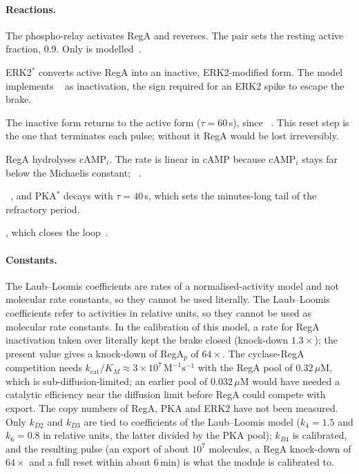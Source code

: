 \paragraph{Reactions.}
\begin{description}\itemsep0pt
\item[10.B1/10.B2] The phospho-relay activates RegA and reverses. The pair sets the resting active fraction, 0.9. Only  is modelled~\cite{thomason1999}.
\item[10.B3] ERK2$^*$ converts active RegA into an inactive, ERK2-modified form. The model implements ~\cite{maeda2004} as inactivation, the sign required for an ERK2 spike to escape the brake.
\item[10.B4] The inactive form returns to the active form ($\tau=60$\,s), since ~\cite{laub1998}. This reset step is the one that terminates each pulse; without it RegA would be lost irreversibly.
\item[10.C1/10.C2] RegA hydrolyses cAMP$_i$. The rate is linear in cAMP because cAMP$_i$ stays far below the Michaelis constant; ~\cite{thomason1999}.
\item[10.D1/10.D2] ~\cite{laub1998}, and PKA$^*$ decays with $\tau=40$\,s, which sets the minutes-long tail of the refractory period.
\item[10.D3] , which closes the loop~\cite{laub1998,aubry1997}.
\end{description}

\paragraph{Constants.}
The Laub--Loomis coefficients are rates of a normalised-activity model and not molecular rate constants, so they cannot be used literally.
The Laub--Loomis coefficients refer to activities in relative units, so they cannot be used as molecular rate constants.
In the calibration of this model, a rate for RegA inactivation taken over literally kept the brake closed (knock-down $1.3\times$); the present value gives a knock-down of RegA$_p$ of $64\times$.
The cyclase-RegA competition needs $k_\mathrm{cat}/K_M\approx3\times10^{7}\,\mathrm{M^{-1}s^{-1}}$ with the RegA pool of $0.32\,\mu$M, which is sub-diffusion-limited; an earlier pool of $0.032\,\mu$M would have needed a catalytic efficiency near the diffusion limit before RegA could compete with export.
The copy numbers of RegA, PKA and ERK2 have not been measured.
Only $k_{D2}$ and $k_{D3}$ are tied to coefficients of the Laub--Loomis model ($k_4=1.5$ and $k_6=0.8$ in relative units, the latter divided by the PKA pool); $k_{B4}$ is calibrated, and the resulting pulse (an export of about $10^7$ molecules, a RegA knock-down of $64\times$ and a full reset within about 6\,min) is what the module is calibrated to.

